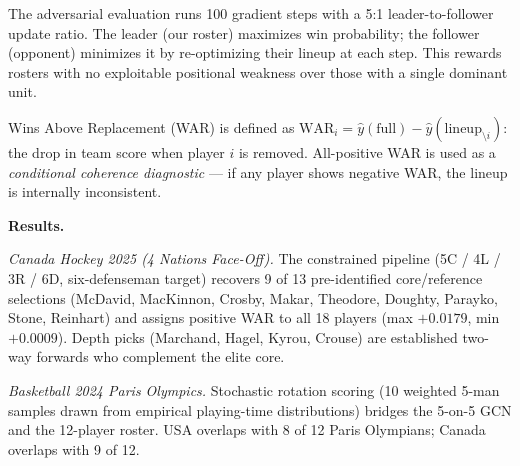 \documentclass[11pt,letterpaper]{article}
\begin{document}
The adversarial evaluation runs 100 gradient steps with a 5:1
leader-to-follower update ratio. The leader (our roster) maximizes
win probability; the follower (opponent) minimizes it by re-optimizing
their lineup at each step. This rewards rosters with no exploitable
positional weakness over those with a single dominant unit.

Wins Above Replacement (WAR) is defined as $\text{WAR}_i = \hat{y}(\text{full}) - \hat{y}(\text{lineup}_{\setminus i})$:
the drop in team score when player $i$ is removed. All-positive WAR
is used as a \emph{conditional coherence diagnostic} — if any player
shows negative WAR, the lineup is internally inconsistent.

\newpage

\textbf{Results.}

\smallskip
\textit{Canada Hockey 2025 (4 Nations Face-Off).}
The constrained pipeline (5C / 4L / 3R / 6D, six-defenseman target)
recovers 9 of 13 pre-identified core/reference selections
(McDavid, MacKinnon, Crosby, Makar, Theodore, Doughty, Parayko,
Stone, Reinhart) and assigns positive WAR to all 18 players
(max $+0.0179$, min $+0.0009$). Depth picks (Marchand, Hagel,
Kyrou, Crouse) are established two-way forwards who complement the
elite core.

\smallskip
\textit{Basketball 2024 Paris Olympics.}
Stochastic rotation scoring (10 weighted 5-man samples drawn from
empirical playing-time distributions) bridges the 5-on-5 GCN and the
12-player roster. USA overlaps with 8 of 12 Paris Olympians; Canada
overlaps with 9 of 12.
\end{document}
